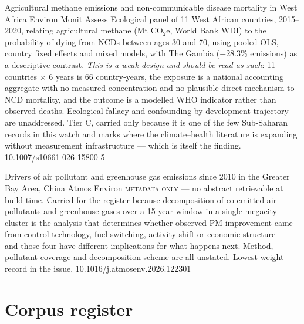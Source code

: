 \documentclass[10pt]{article}
\begin{document}
{Agricultural methane emissions and non-communicable disease mortality in West Africa}
{Environ Monit Assess}
{Ecological panel of 11 West African countries, 2015--2020, relating agricultural methane
(Mt CO$_2$e, World Bank WDI) to the probability of dying from NCDs between ages 30 and 70,
using pooled OLS, country fixed effects and mixed models, with The Gambia
($-$28.3\% emissions) as a descriptive contrast. \emph{This is a weak design and should be
read as such}: 11 countries $\times$ 6 years is 66 country-years, the exposure is a
national accounting aggregate with no measured concentration and no plausible direct
mechanism to NCD mortality, and the outcome is a modelled WHO indicator rather than
observed deaths. Ecological fallacy and confounding by development trajectory are
unaddressed. Tier C, carried only because it is one of the few Sub-Saharan records in
this watch and marks where the climate--health literature is expanding without
measurement infrastructure --- which is itself the finding.}
{10.1007/s10661-026-15800-5}

{Drivers of air pollutant and greenhouse gas emissions since 2010 in the Greater Bay
Area, China}
{Atmos Environ}
{\textsc{metadata only} --- no abstract retrievable at build time. Carried for the
register because decomposition of co-emitted air pollutants and greenhouse gases over a
15-year window in a single megacity cluster is the analysis that determines whether
observed PM improvement came from control technology, fuel switching, activity shift or
economic structure --- and those four have different implications for what happens next.
Method, pollutant coverage and decomposition scheme are all unstated. Lowest-weight
record in the issue.}
{10.1016/j.atmosenv.2026.122301}

\clearpage

\section*{\sffamily\bfseries\color{Deep}Corpus register}
\vspace{-1.5mm}{\color{Amber}\rule{\linewidth}{1.1pt}}\vspace{2.5mm}


\end{document}
